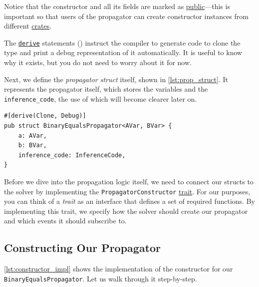 \documentclass{article}
\begin{document}
Notice that the constructor and all its fields are marked as \href{https://doc.rust-lang.org/book/ch07-03-paths-for-referring-to-an-item-in-the-module-tree.html#exposing-paths-with-the-pub-keyword}{public}—this is important so that users of the propagator can create constructor instances from different \href{https://doc.rust-lang.org/book/ch07-01-packages-and-crates.html}{crates}.

The \href{https://doc.rust-lang.org/book/appendix-03-derivable-traits.html#appendix-c-derivable-traits}{\texttt{derive}} statements () instruct the compiler to generate code to clone the type and print a debug representation of it automatically.
It is useful to know why it exists, but you do not need to worry about it for now.

Next, we define the \emph{propagator struct} itself, shown in \autoref{lst:prop_struct}.
It represents the propagator itself, which stores the variables and the \texttt{inference\_code}, the use of which will become clearer later on.

\begin{listing}[H]
\begin{verbatim}
#[derive(Clone, Debug)]
pub struct BinaryEqualsPropagator<AVar, BVar> {
    a: AVar,
    b: BVar,
    inference_code: InferenceCode,
}
\end{verbatim}
\caption{The \texttt{BinaryEqualsPropagator} struct}
\label{lst:prop_struct}
\end{listing}

Before we dive into the propagation logic itself, we need to connect our structs to the solver by implementing the \texttt{PropagatorConstructor} \href{https://doc.rust-lang.org/book/ch10-02-traits.html}{trait}.
For our purposes, you can think of a \emph{trait} as an interface that defines a set of required functions.  
By implementing this trait, we specify how the solver should create our propagator and which events it should subscribe to.

\subsection{Constructing Our Propagator}

\autoref{lst:constructor_impl} shows the implementation of the constructor for our \texttt{BinaryEqualsPropagator}. Let us walk through it step-by-step.
\end{document}
